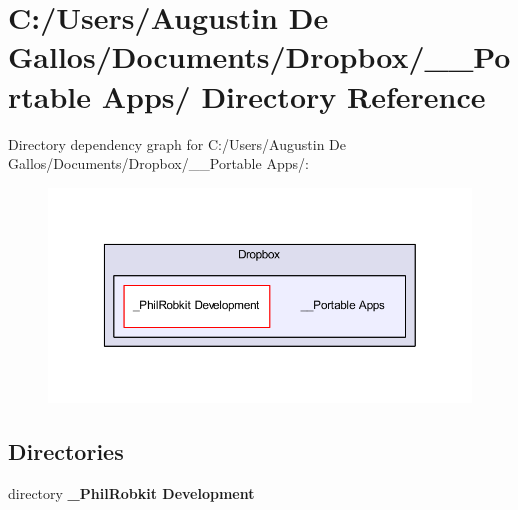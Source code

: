 \section{C\-:/\-Users/\-Augustin De Gallos/\-Documents/\-Dropbox/\-\_\-\-\_\-\-Portable Apps/ Directory Reference}
\label{dir_de1116316d0f61c6e7eac44b18cab33b}
Directory dependency graph for C\-:/\-Users/\-Augustin De Gallos/\-Documents/\-Dropbox/\-\_\-\-\_\-\-Portable Apps/\-:\nopagebreak
\begin{figure}[H]
\begin{center}
\leavevmode
\includegraphics[width=350pt]{dir_de1116316d0f61c6e7eac44b18cab33b_dep}
\end{center}
\end{figure}
\subsection*{Directories}
\begin{DoxyCompactItemize}
\item 
directory {\bf \-\_\-\-Phil\-Robkit Development}
\end{DoxyCompactItemize}
